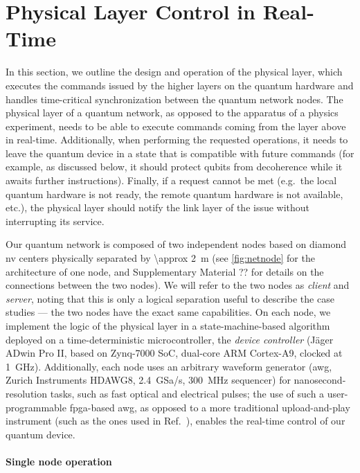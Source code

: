 \section{Physical Layer Control in Real-Time}
\label{sec:netstack:phys}

In this section, we outline the design and operation of the physical layer, which executes the
commands issued by the higher layers on the quantum hardware and handles time-critical
synchronization between the quantum network nodes. The physical layer of a quantum network, as
opposed to the apparatus of a physics experiment, needs to be able to execute commands coming from
the layer above in real-time. Additionally, when performing the requested operations, it needs to
leave the quantum device in a state that is compatible with future commands (for example, as
discussed below, it should protect qubits from decoherence while it awaits further instructions).
Finally, if a request cannot be met (e.g.~the local quantum hardware is not ready, the remote
quantum hardware is not available, etc.), the physical layer should notify the link layer of the
issue without interrupting its service.

Our quantum network is composed of two independent nodes based on diamond \acrshort{nv} centers
physically separated by \qty{\approx 2}{m} (see \cref{fig:netnode} for the architecture of one node,
and Supplementary Material ?? for details on the connections between the two nodes). We will refer
to the two nodes as \emph{client} and \emph{server}, noting that this is only a logical separation
useful to describe the case studies --- the two nodes have the exact same capabilities. On each
node, we implement the logic of the physical layer in a state-machine-based algorithm deployed on a
time-deterministic microcontroller, the \emph{device controller} (J\"ager ADwin Pro II, based on
Zynq-7000 SoC, dual-core ARM Cortex-A9, clocked at \qty{1}{\GHz}). Additionally, each node uses an
arbitrary waveform generator (\acrshort{awg}, Zurich Instruments HDAWG8, \qty{2.4}{GSa/s},
\qty{300}{\MHz} sequencer) for nanosecond-resolution tasks, such as fast optical and electrical
pulses; the use of such a user-programmable \acrshort{fpga}-based \acrshort{awg}, as opposed to a
more traditional upload-and-play instrument (such as the ones used in
Ref.~\cite{pompili_2021_multinode}), enables the real-time control of our quantum device.

\paragraph{Single node operation}

